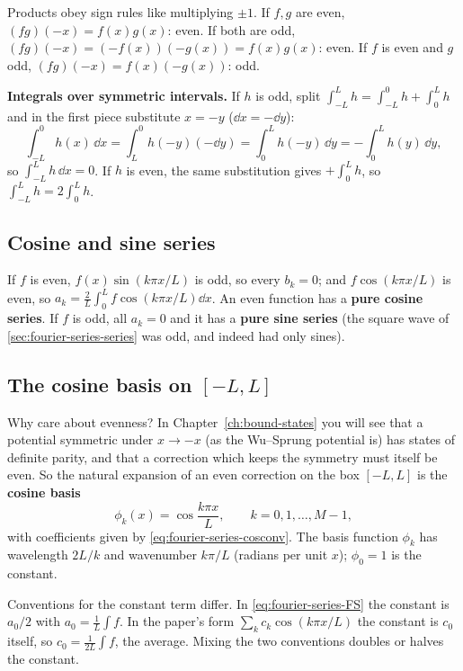 Products obey sign rules like multiplying $\pm1$. If $f,g$ are even, $(fg)(-x)=f(x)g(x)$: even. If both are odd, $(fg)(-x)=(-f(x))(-g(x))=f(x)g(x)$: even. If $f$ is even and $g$ odd, $(fg)(-x)=f(x)(-g(x))$: odd.

\textbf{Integrals over symmetric intervals.} If $h$ is odd, split $\int_{-L}^{L}h=\int_{-L}^{0}h+\int_0^Lh$ and in the first piece substitute $x=-y$ ($\dd x=-\dd y$):
\begin{equation}
\int_{-L}^{0}h(x)\,\dd x=\int_{L}^{0}h(-y)(-\dd y)=\int_0^Lh(-y)\,\dd y=-\int_0^Lh(y)\,\dd y,
\end{equation}
so $\int_{-L}^{L}h\,\dd x=0$. If $h$ is even, the same substitution gives $+\int_0^Lh$, so $\int_{-L}^{L}h=2\int_0^Lh$.

\subsection{Cosine and sine series}

If $f$ is even, $f(x)\sin(k\pi x/L)$ is odd, so every $b_k=0$; and $f\cos(k\pi x/L)$ is even, so $a_k=\frac2L\int_0^Lf\cos(k\pi x/L)\dd x$. An even function has a \textbf{pure cosine series}. If $f$ is odd, all $a_k=0$ and it has a \textbf{pure sine series} (the square wave of \cref{sec:fourier-series-series} was odd, and indeed had only sines).

\subsection{The cosine basis on \texorpdfstring{$[-L,L]$}{[-L,L]}}

Why care about evenness? In Chapter~\ref{ch:bound-states} you will see that a potential symmetric under $x\to-x$ (as the Wu--Sprung potential is) has states of definite parity, and that a correction which keeps the symmetry must itself be even. So the natural expansion of an even correction on the box $[-L,L]$ is the \textbf{cosine basis}
\begin{equation}
\phi_k(x)=\cos\frac{k\pi x}{L},\qquad k=0,1,\dots,M-1,
\label{eq:fourier-series-basis}
\end{equation}
with coefficients given by \cref{eq:fourier-series-cosconv}. The basis function $\phi_k$ has wavelength $2L/k$ and wavenumber $k\pi/L$ (radians per unit $x$); $\phi_0=1$ is the constant.

\begin{pitfall}
Conventions for the constant term differ. In \cref{eq:fourier-series-FS} the constant is $a_0/2$ with $a_0=\frac1L\int f$. In the paper's form $\sum_kc_k\cos(k\pi x/L)$ the constant is $c_0$ itself, so $c_0=\frac1{2L}\int f$, the average. Mixing the two conventions doubles or halves the constant.
\end{pitfall}

